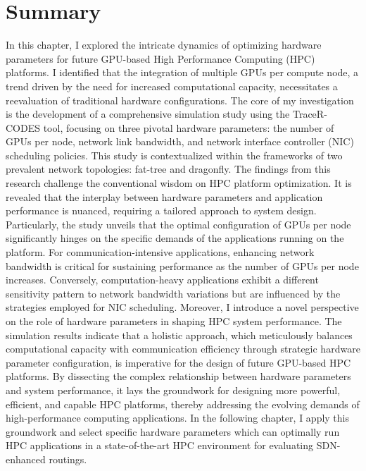\section{Summary}
In this chapter, I explored the intricate dynamics of optimizing hardware parameters for future GPU-based High Performance Computing (HPC) platforms. I identified that the integration of multiple GPUs per compute node, a trend driven by the need for increased computational capacity, necessitates a reevaluation of traditional hardware configurations. The core of my investigation is the development of a comprehensive simulation study using the TraceR-CODES tool, focusing on three pivotal hardware parameters: the number of GPUs per node, network link bandwidth, and network interface controller (NIC) scheduling policies. This study is contextualized within the frameworks of two prevalent network topologies: fat-tree and dragonfly.
The findings from this research challenge the conventional wisdom on HPC platform optimization. It is revealed that the interplay between hardware parameters and application performance is nuanced, requiring a tailored approach to system design. Particularly, the study unveils that the optimal configuration of GPUs per node significantly hinges on the specific demands of the applications running on the platform. For communication-intensive applications, enhancing network bandwidth is critical for sustaining performance as the number of GPUs per node increases. Conversely, computation-heavy applications exhibit a different sensitivity pattern to network bandwidth variations but are influenced by the strategies employed for NIC scheduling.
Moreover, I introduce a novel perspective on the role of hardware parameters in shaping HPC system performance. The simulation results indicate that a holistic approach, which meticulously balances computational capacity with communication efficiency through strategic hardware parameter configuration, is imperative for the design of future GPU-based HPC platforms.
By dissecting the complex relationship between hardware parameters and system performance, it lays the groundwork for designing more powerful, efficient, and capable HPC platforms, thereby addressing the evolving demands of high-performance computing applications.
In the following chapter, I apply this groundwork and select specific hardware parameters which can optimally run HPC applications in a state-of-the-art HPC environment for evaluating SDN-enhanced routings.

